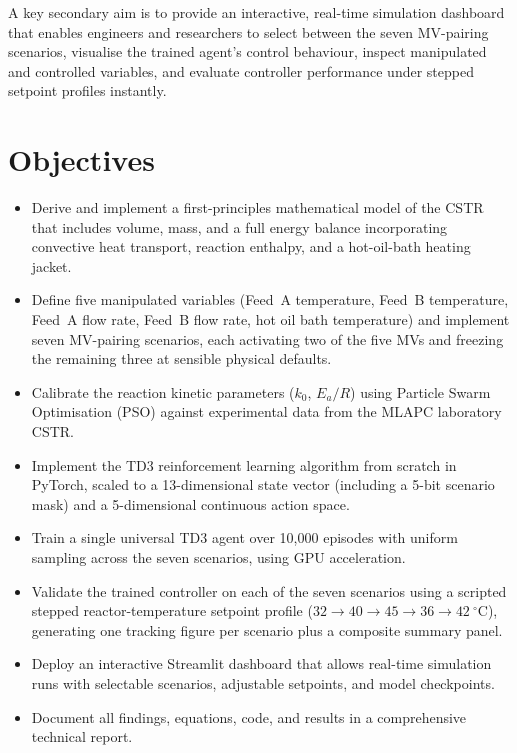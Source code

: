 \documentclass[12pt,a4paper]{article}
\begin{document}
A key secondary aim is to provide an interactive, real-time simulation
dashboard that enables engineers and researchers to select between the seven
MV-pairing scenarios, visualise the trained agent's control behaviour, inspect
manipulated and controlled variables, and evaluate controller performance under
stepped setpoint profiles instantly.

\section{Objectives}

\begin{itemize}
  \item Derive and implement a first-principles mathematical model of the CSTR
        that includes volume, mass, and a full energy balance incorporating
        convective heat transport, reaction enthalpy, and a hot-oil-bath
        heating jacket.

  \item Define five manipulated variables (Feed~A temperature, Feed~B
        temperature, Feed~A flow rate, Feed~B flow rate, hot oil bath
        temperature) and implement seven MV-pairing scenarios, each activating
        two of the five MVs and freezing the remaining three at sensible
        physical defaults.

  \item Calibrate the reaction kinetic parameters ($k_0$, $E_a/R$) using
        Particle Swarm Optimisation (PSO) against experimental data from the
        MLAPC laboratory CSTR.

  \item Implement the TD3 reinforcement learning algorithm from scratch in
        PyTorch, scaled to a 13-dimensional state vector (including a 5-bit
        scenario mask) and a 5-dimensional continuous action space.

  \item Train a single universal TD3 agent over 10{,}000 episodes with uniform
        sampling across the seven scenarios, using GPU acceleration.

  \item Validate the trained controller on each of the seven scenarios using a
        scripted stepped reactor-temperature setpoint profile
        ($32\to40\to45\to36\to42~^\circ\mathrm{C}$), generating one tracking
        figure per scenario plus a composite summary panel.

  \item Deploy an interactive Streamlit dashboard that allows real-time
        simulation runs with selectable scenarios, adjustable setpoints, and
        model checkpoints.

  \item Document all findings, equations, code, and results in a comprehensive
        technical report.
\end{itemize}
\end{document}
